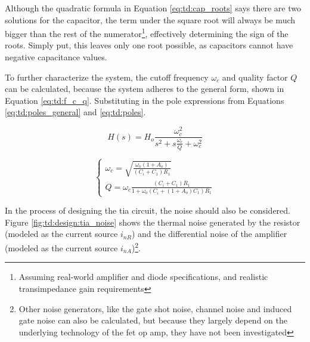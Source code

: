 Although the quadratic formula in Equation \eqref{eq:td:cap_roots} says there are two solutions for the capacitor, the term under the square root will always be much bigger than the rest of the numerator\footnote{Assuming real-world amplifier and diode specifications, and realistic transimpedance gain requirements}, effectively determining the sign of the roots. Simply put, this leaves only one root possible, as capacitors cannot have negative capacitance values.

To further characterize the system, the cutoff frequency $\omega_c$ and quality factor $Q$ can be calculated, because the system adheres to the general form, shown in Equation \eqref{eq:td:f_c_q}. Substituting in the pole expressions from Equations \eqref{eq:td:poles_general} and \eqref{eq:td:poles}.

\begin{equation}\label{eq:td:f_c_q}
	H(s) = H_o\frac{\omega_c^2}{s^2 + s\frac{\omega_c}{Q} + \omega_c^2}
\end{equation}

\begin{equation}
	\begin{cases}
		\omega_c = \sqrt{\frac{\omega_o(1 + A_o)}{(C_i + C_1)R_1}}\\
		Q = \omega_c\frac{(C_i + C_1)R_1}{1 + \omega_o(C_i + (1 + A_o)C_1)R_1}
	\end{cases}
\end{equation}


In the process of designing the \gls{tia} circuit, the noise should also be considered. Figure \ref{fig:td:design:tia_noise} shows the thermal noise generated by the resistor (modeled as the current source $i_{nR}$) and the differential noise of the amplifier (modeled as the current source $i_{nA}$)\footnote{Other noise generators, like the gate shot noise, channel noise and induced gate noise can also be calculated, but because they largely depend on the underlying technology of the \gls{fet} op amp, they have not been investigated}.

